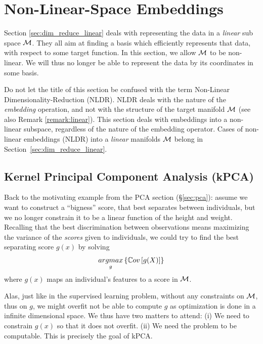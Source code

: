 \section{Non-Linear-Space Embeddings}
\label{sec:dim_reduce_nonlinear}


Section \ref{sec:dim_reduce_linear} deals with representing the data in a \emph{linear} sub space $\mathcal{M}$. They all aim at finding a basis which efficiently represents that data, with respect to some target function. 
In this section, we allow $\mathcal{M}$ to be non-linear. 
We will thus no longer be able to represent the data by its coordinates in some basis.


\begin{remark}
\label{remark:nldr}
	Do not let the title of this section be confused with the term Non-Linear Dimensionality-Reduction (NLDR).
	NLDR deals with the nature of the \emph{embedding} operation, and not with the structure of the target manifold $\mathcal{M}$ (see also Remark \ref{remark:linear}).
	This section deals with embeddings into a non-linear subspace, regardless of the nature of the embedding operator.
	Cases of non-linear embeddings (NLDR) into a \emph{linear} manifolds $\mathcal{M}$ belong in Section~\ref{sec:dim_reduce_linear}.
\end{remark}




\subsection{Kernel Principal Component Analysis (kPCA)}
\label{sec:kpca}

Back to the motivating example from the PCA section (\S\ref{sec:pca}): assume we want to construct a ``bigness'' score, that best separates between individuals, but we no longer constrain it to be a linear function of the height and weight.
Recalling that the best discrimination between observations means maximizing the variance of the \emph{scores} given to individuals, we could try to find the best separating score $g(x)$ by solving 
\begin{align}
\label{eq:kpca_wrong}
	\mathop{argmax}_{g}\left\{ \mathbb{C}ov \left[ g(X) \right] \right\}
\end{align}
where $g(x)$ maps an individual's features to a score in $\mathcal{M}$.

Alas, just like in the supervised learning problem, without any constraints on $\mathcal{M}$, thus on $g$, we might overfit \andor not be able to compute $g$ as optimization is done in a infinite dimensional space. 
We thus have two matters to attend:
(i) We need to constrain $g(x)$ so that it does not overfit.
(ii) We need the problem to be computable.
This is precisely the goal of kPCA. 

